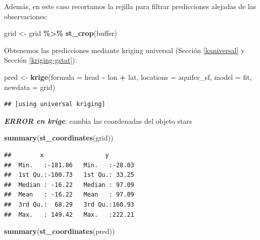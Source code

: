 \documentclass[
]{book}
\newenvironment{Shaded}{\begin{snugshade}}{\end{snugshade}}
\newcommand{\AttributeTok}[1]{\textcolor[rgb]{0.13,0.29,0.53}{#1}}
\newcommand{\FunctionTok}[1]{\textcolor[rgb]{0.13,0.29,0.53}{\textbf{#1}}}
\newcommand{\NormalTok}[1]{#1}
\newcommand{\OtherTok}[1]{\textcolor[rgb]{0.56,0.35,0.01}{#1}}
\newcommand{\SpecialCharTok}[1]{\textcolor[rgb]{0.81,0.36,0.00}{\textbf{#1}}}
\theoremstyle{break}
\theoremstyle{definition}
\theoremstyle{definition}
\theoremstyle{definition}
\theoremstyle{definition}
\theoremstyle{remark}
\begin{document}
Además, en este caso recortamos la rejilla para filtrar predicciones alejadas de las observaciones:

\begin{Shaded}
\begin{Highlighting}[]
\NormalTok{grid }\OtherTok{\textless{}{-}}\NormalTok{ grid }\SpecialCharTok{\%\textgreater{}\%} \FunctionTok{st\_crop}\NormalTok{(buffer)}
\end{Highlighting}
\end{Shaded}

Obtenemos las predicciones mediante kriging universal (Sección \ref{kuniversal} y Sección \ref{kriging-gstat}):

\begin{Shaded}
\begin{Highlighting}[]
\NormalTok{pred }\OtherTok{\textless{}{-}} \FunctionTok{krige}\NormalTok{(}\AttributeTok{formula =}\NormalTok{ head }\SpecialCharTok{\textasciitilde{}}\NormalTok{ lon }\SpecialCharTok{+}\NormalTok{ lat, }\AttributeTok{locations =}\NormalTok{ aquifer\_sf, }\AttributeTok{model =}\NormalTok{ fit,}
              \AttributeTok{newdata =}\NormalTok{ grid)}
\end{Highlighting}
\end{Shaded}

\begin{verbatim}
## [using universal kriging]
\end{verbatim}

\textbf{\emph{ERROR en krige}}: cambia las coordenadas del objeto stars

\begin{Shaded}
\begin{Highlighting}[]
\FunctionTok{summary}\NormalTok{(}\FunctionTok{st\_coordinates}\NormalTok{(grid))}
\end{Highlighting}
\end{Shaded}

\begin{verbatim}
##        x                 y         
##  Min.   :-181.86   Min.   :-28.03  
##  1st Qu.:-100.73   1st Qu.: 33.25  
##  Median : -16.22   Median : 97.09  
##  Mean   : -16.22   Mean   : 97.09  
##  3rd Qu.:  68.29   3rd Qu.:160.93  
##  Max.   : 149.42   Max.   :222.21
\end{verbatim}

\begin{Shaded}
\begin{Highlighting}[]
\FunctionTok{summary}\NormalTok{(}\FunctionTok{st\_coordinates}\NormalTok{(pred))}
\end{Highlighting}
\end{Shaded}
\end{document}
